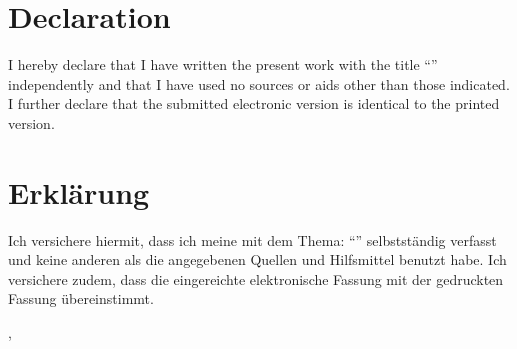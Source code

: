 
\thispagestyle{empty}

\ifenglisch
\section*{Declaration}

\vspace*{2em}

I hereby declare that I have written the present work with the title \enquote{\titel} independently and that I have used no sources or aids other than those indicated.
I further declare that the submitted electronic version is identical to the printed version.
\else
\section*{Erklärung}

\vspace*{2em}

Ich versichere hiermit, dass ich meine \arbeit{} mit dem Thema: \enquote{\titel} selbstständig verfasst und keine anderen als die angegebenen Quellen und Hilfsmittel benutzt habe.
Ich versichere zudem, dass die eingereichte elektronische Fassung mit der gedruckten Fassung übereinstimmt.
\fi

\vspace{3em}

\abgabeort, \datumAbgabe
\vspace{4em}

\autor
